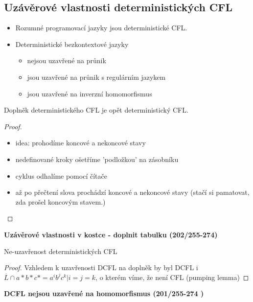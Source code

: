 \documentclass[../main.tex]{subfiles}
\begin{document}
\subsection{Uzávěrové vlastnosti deterministických CFL}
\begin{itemize}
    \item Rozumné programovací jazyky jsou deterministické CFL.
    \item Deterministické bezkontextové jazyky
    \begin{itemize}
        \item nejsou uzavřené na průnik
        \item jsou uzavřené na průnik s regulárním jazykem
        \item jsou uzavřené na inverzní homomorfismus
    \end{itemize}
\end{itemize}
\begin{theorem}
    Doplněk deterministického CFL je opět deterministický CFL.
    \begin{proof}
        \begin{itemize}
            \item idea: prohodíme koncové a nekoncové stavy
            \item nedefinované kroky ošetříme 'podložkou' na zásobníku
            \item cyklus odhalíme pomocí čítače
            \item až po přečtení slova prochádzí koncové a nekoncové stavy (stačí si pamatovat, zda prošel koncovým stavem.)
        \end{itemize}
    \end{proof}
\end{theorem}
\textbf{Uzávěrové vlastnosti v kostce - doplnit tabulku (202/255-274)}
\begin{remark}
    Ne-uzavřenost deterministických CFL
    \begin{proof}
        Vzhledem k uzavřenosti DCFL na doplněk by byl DCFL i $\overline{L}\cap a*b*c* = {a^ib^jc^k|i=j=k}$,
        o kterém víme, že není CFL (pumping lemma)
    \end{proof}
\end{remark}
\textbf{DCFL nejsou uzavřené na homomorfismus (201/255-274 )}
\end{document}
